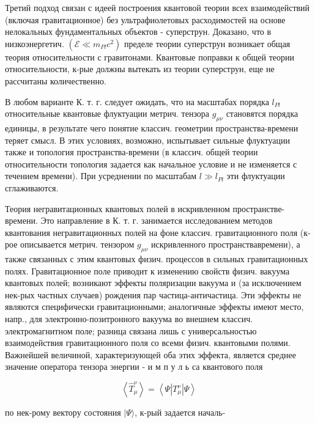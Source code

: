 \documentclass[10pt]{article}
\begin{document}
Третий подход связан с идеей построения квантовой теории всех взаимодействий (включая гравитационное) без ультрафиолетовых расходимостей на основе нелокальных фундаментальных объектов - суперструн. Доказано, что в низкоэнергетич. $\left(\mathscr{E} \ll m_{P l} c^{2}\right)$ пределе теории суперструн возникает общая теория относительности с гравитонами. Квантовые поправки к общей теории относительности, к-рые должны вытекать из теории суперструн, еще не рассчитаны количественно.



В любом варианте К. т. г. следует ожидать, что на масштабах порядка $l_{P l}$ относительные квантовые флуктуации метрич. тензора $g_{\mu \nu}$ становятся порядка единицы, в результате чего понятие классич. геометрии пространства-времени теряет смысл. В этих условиях, возможно, испытывает сильные флуктуации также и топология пространства-времени (в классич. общей теории относительности топология задается как начальное условие и не изменяется с течением времени). При усреднении по масштабам $l \gg l_{P l}$ эти флуктуации сглаживаются.



Теория негравитационных квантовых полей в искривленном пространстве-времени. Это направление в К. т. г. занимается исследованием методов квантования негравитационных полей на фоне классич. гравитационного поля (к-рое описывается метрич. тензором $g_{\mu \nu}$ искривленного пространствавремени), а также связанных с этим квантовых физич. процессов в сильных гравитационных полях. Гравитационное поле приводит к изменению свойств физич. вакуума квантовых полей; возникают эффекты поляризации вакуума и (за исключением нек-рых частных случаев) рождения пар частица-античастица. Эти эффекты не являются специфически гравитационными; аналогичные эффекты имеют место, напр., для электронно-позитронного вакуума во внешнем классич. электромагнитном поле; разница связана лишь с универсальностью взаимодействия гравитационного поля со всеми физич. квантовыми полями. Важнейшей величиной, характеризующей оба этих эффекта, является среднее значение оператора тензора энергии - и м п у л ь са квантового поля



\[

\left\langle\hat{T}_{\mu}^{\nu}\right\rangle=\left\langle\Psi\left|T_{\mu}^{\nu}\right| \Psi\right\rangle

\]



по нек-рому вектору состояния $|\Psi\rangle$, к-рый задается началь-
\end{document}
